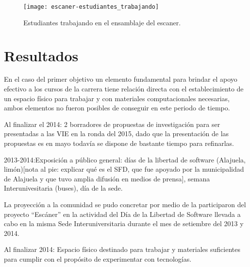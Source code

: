 \documentclass[conference]{IEEEtran}
\begin{document}
\begin{figure}[!t]
\centering
\texttt{[image: escaner-estudiantes\_trabajando]}
\caption{Estudiantes trabajando en el ensamblaje del escaner.}
\label{escaner}
\end{figure}




\section{Resultados}

En el caso del primer objetivo un elemento fundamental para brindar el apoyo
efectivo a los cursos de la carrera tiene relación directa con el
establecimiento de un espacio físico para trabajar y con materiales
computacionales necesarias, ambos elementos no fueron posibles de conseguir en
este periodo de tiempo. 



Al finalizar el 2014: 2 borradores de propuestas de investigación para ser
presentadas a las VIE en la ronda del 2015, dado que la presentación de las
propuestas es en mayo todavía se dispone de bastante tiempo para refinarlas. 

2013-2014:Exposición a público general: días de la libertad de software
(Alajuela, limón)[nota al pie: explicar qué es el SFD, que fue apoyado por la
municipalidad de Alajuela y que tuvo amplia difusión en medios de prensa],
semana Interunivesitaria (buses), día de la sede. 

La proyección a la comunidad se pudo concretar por medio de la participaron del
proyecto “Escáner” en la actividad del Día de la Libertad de Software llevada a
cabo en la misma Sede Interuniversitaria durante el mes de setiembre del 2013 y
2014.

Al finalizar 2014: Espacio físico destinado para trabajar y materiales
suficientes para cumplir con el propósito de experimentar con tecnologías.  
\end{document}
